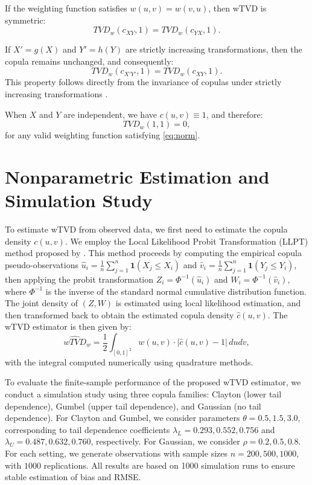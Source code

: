 \documentclass[twoside]{article}
\begin{document}
\begin{pro}[Symmetry]\label{prop:symmetry}
If the weighting function satisfies \( w(u,v) = w(v,u) \), then wTVD is symmetric:
\[
TVD_w(c_{XY},1) = TVD_w(c_{YX},1).
\]
\end{pro}

\begin{pro}\label{prop:invariance}
If \( X' = g(X) \) and \( Y' = h(Y) \) are strictly increasing transformations, then the copula remains unchanged, and consequently:
\[
TVD_w(c_{X'Y'},1) = TVD_w(c_{XY},1).
\]
This property follows directly from the invariance of copulas under strictly increasing transformations \cite{Nelsen2006, joe2014dependence}.
\end{pro}

\begin{pro}\label{prop:zero}
When \( X \) and \( Y \) are independent, we have \( c(u,v) \equiv 1 \), and therefore:
\[
TVD_w(1,1) = 0,
\]
for any valid weighting function satisfying \eqref{eq:norm}.
\end{pro}

\section{Nonparametric Estimation and Simulation Study}

To estimate wTVD from observed data, we first need to estimate the copula density \( c(u,v) \). We employ the Local Likelihood Probit Transformation (LLPT) method proposed by \cite{Geenens2017}. This method proceeds by computing the empirical copula pseudo-observations \( \hat{u}_i = \frac{1}{n} \sum_{j=1}^n \mathbf{1}(X_j \leq X_i) \) and \( \hat{v}_i = \frac{1}{n} \sum_{j=1}^n \mathbf{1}(Y_j \leq Y_i) \), then applying the probit transformation \( Z_i = \Phi^{-1}(\hat{u}_i) \) and \( W_i = \Phi^{-1}(\hat{v}_i) \), where \( \Phi^{-1} \) is the inverse of the standard normal cumulative distribution function. The joint density of \( (Z,W) \) is estimated using local likelihood estimation, and then transformed back to obtain the estimated copula density \( \hat{c}(u,v) \). The wTVD estimator is then given by:
\begin{equation}\label{eq:estimator}
\widehat{wTVD}_w = \frac{1}{2} \int_{[0,1]^2} w(u,v) \cdot |\hat{c}(u,v) - 1| \, du dv,
\end{equation}
with the integral computed numerically using quadrature methods.

To evaluate the finite-sample performance of the proposed wTVD estimator, we conduct a simulation study using three copula families: Clayton (lower tail dependence), Gumbel (upper tail dependence), and Gaussian (no tail dependence). For Clayton and Gumbel, we consider parameters $\theta = 0.5, 1.5, 3.0$, corresponding to tail dependence coefficients $\lambda_L = 0.293, 0.552, 0.756$ and $\lambda_U = 0.487, 0.632, 0.760$, respectively. For Gaussian, we consider $\rho = 0.2, 0.5, 0.8$. For each setting, we generate observations with sample sizes $n = 200, 500, 1000$, with $1000$ replications. All results are based on 1000 simulation runs to ensure stable estimation of bias and RMSE.
\end{document}
